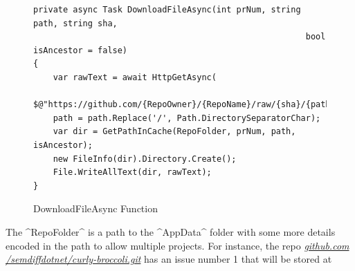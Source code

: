\documentclass[draftclsnofoot,onecolumn]{IEEEtran}
\begin{document}
\begin{figure}[p]
\centering
\begin{lstlisting}
private async Task DownloadFileAsync(int prNum, string path, string sha, 
                                                       bool isAncestor = false)
{
    var rawText = await HttpGetAsync(
	           $@"https://github.com/{RepoOwner}/{RepoName}/raw/{sha}/{path}");
    path = path.Replace('/', Path.DirectorySeparatorChar);
    var dir = GetPathInCache(RepoFolder, prNum, path, isAncestor);
    new FileInfo(dir).Directory.Create();
    File.WriteAllText(dir, rawText);
}
\end{lstlisting}
\caption{DownloadFileAsync Function}
\label{DownloadFileAsync}
\end{figure}

The ^RepoFolder^ is a path to the ^AppData^ folder with some more details 
encoded in the path to allow multiple projects. For instance, the repo 
\textit{\url{github.com /semdiffdotnet/curly-broccoli.git}} has an issue 
number 1 that will be stored at 
\end{document}
